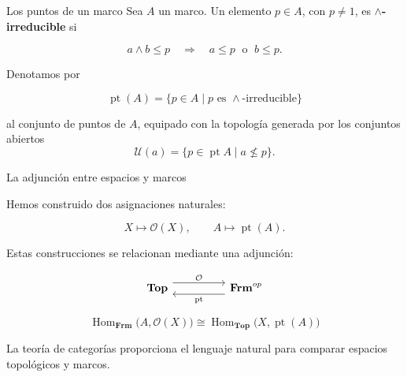 \documentclass[compress,12pt]{beamer}
\DeclareMathOperator{\pt}{pt}
\begin{document}
\begin{frame}{Los puntos de un marco}
Sea $A$ un marco. Un elemento $p\in A$, con $p\neq 1$, es
\textbf{$\wedge$-irreducible} si

\[
    a\wedge b\leq p
    \quad\Longrightarrow\quad
    a\leq p \;\text{ o }\; b\leq p.
\]

\pause

\medskip

Denotamos por

\[
    \operatorname{pt}(A)
    =
    \{p\in A\mid p \text{ es } \wedge\text{-irreducible}\}
\]

al conjunto de puntos de $A$, equipado con la topología generada por los conjuntos abiertos
\[
    \mathcal{U}(a)=\{p\in \pt A\mid a\nleq p\}.
\]

\end{frame}

\begin{frame}[fragile]{La adjunción entre espacios y marcos}
\small{
Hemos construido dos asignaciones naturales:

\[
    X \longmapsto \mathcal O(X),
    \qquad
    A \longmapsto \operatorname{pt}(A).
\]

\pause

\medskip

Estas construcciones se relacionan mediante una adjunción:

\[
\begin{tikzcd}[column sep=huge]
    \mathbf{Top}
    \arrow[r, shift left=1.2ex, "\mathcal O"]
&
    \mathbf{Frm}^{op}
    \arrow[l, shift left=1.2ex, "\operatorname{pt}"]
\end{tikzcd}
\]

\[
\boxed{
\operatorname{Hom}_{\mathbf{Frm}}
\bigl(A,\mathcal O(X)\bigr)
\cong
\operatorname{Hom}_{\mathbf{Top}}
\bigl(X,\operatorname{pt}(A)\bigr)
}
\]

\pause

\begin{block}{}
\centering
La teoría de categorías proporciona el lenguaje natural
para comparar espacios topológicos y marcos.
\end{block}
}
\end{frame}
\end{document}
